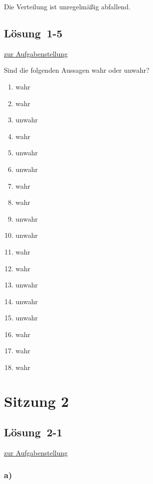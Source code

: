 \documentclass[
  11pt,
  ngerman,
  a4paper,
]{report}
\providecommand{\tightlist}{%
  \setlength{\itemsep}{0pt}\setlength{\parskip}{0pt}}
\begin{document}
Die Verteilung ist unregelmäßig abfallend.

\hypertarget{loesung-1-5}{%
\subsection{Lösung~1-5}\label{loesung-1-5}}

\protect\hyperlink{aufgabe-1-5}{zur Aufgabenstellung}

Sind die folgenden Aussagen wahr oder unwahr?

\begin{enumerate}
\def\labelenumi{\alph{enumi})}
\tightlist
\item
  wahr
\item
  wahr
\item
  unwahr
\item
  wahr
\item
  unwahr
\item
  unwahr
\item
  wahr
\item
  wahr
\item
  unwahr
\item
  unwahr
\item
  wahr
\item
  wahr
\item
  unwahr
\item
  unwahr
\item
  unwahr
\item
  wahr
\item
  wahr
\item
  wahr
\end{enumerate}

\hypertarget{sitzung-2}{%
\section*{Sitzung 2}\label{sitzung-2}}

\hypertarget{loesung-2-1}{%
\subsection{Lösung~2-1}\label{loesung-2-1}}

\protect\hyperlink{aufgabe-2-1}{zur Aufgabenstellung}

\hypertarget{a-2}{%
\subsubsection{a)}\label{a-2}}
\end{document}
